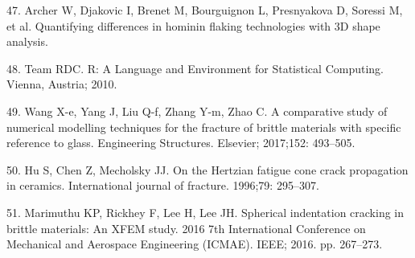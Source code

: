 \documentclass[10pt,letterpaper]{article}
\newenvironment{cslreferences}%
  {}%
  {\par}
\begin{document}
\begin{cslreferences}
\leavevmode\hypertarget{ref-archer_quantifying_nodate}{}%
47. Archer W, Djakovic I, Brenet M, Bourguignon L, Presnyakova D,
Soressi M, et al. Quantifying differences in hominin flaking
technologies with 3D shape analysis.

\leavevmode\hypertarget{ref-team_r_2010}{}%
48. Team RDC. R: A Language and Environment for Statistical Computing.
Vienna, Austria; 2010.

\leavevmode\hypertarget{ref-wang_comparative_2017}{}%
49. Wang X-e, Yang J, Liu Q-f, Zhang Y-m, Zhao C. A comparative study of
numerical modelling techniques for the fracture of brittle materials
with specific reference to glass. Engineering Structures. Elsevier;
2017;152: 493--505.

\leavevmode\hypertarget{ref-hu_hertzian_1996}{}%
50. Hu S, Chen Z, Mecholsky JJ. On the Hertzian fatigue cone crack
propagation in ceramics. International journal of fracture. 1996;79:
295--307.

\leavevmode\hypertarget{ref-marimuthu_spherical_2016}{}%
51. Marimuthu KP, Rickhey F, Lee H, Lee JH. Spherical indentation
cracking in brittle materials: An XFEM study. 2016 7th International
Conference on Mechanical and Aerospace Engineering (ICMAE). IEEE; 2016.
pp. 267--273.
\end{cslreferences}

\nolinenumbers
\end{document}
